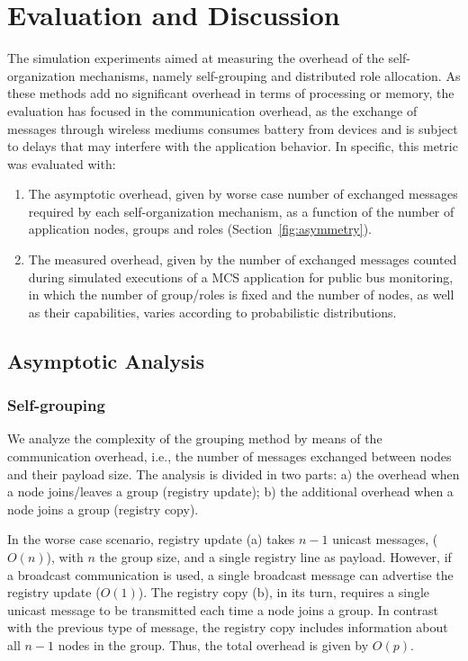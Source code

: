 

\section{Evaluation and Discussion}\label{sec:evaluation}



The simulation experiments aimed at measuring the overhead of the self-organization mechanisms, namely self-grouping and distributed role allocation. As these methods add no significant overhead in terms of processing or memory, the evaluation has focused in the communication overhead, as the exchange of messages through wireless mediums consumes battery from devices and is subject to delays that may interfere with the application behavior. In specific, this metric was evaluated with:

\begin{enumerate}[label=\Alph*]
	
	\item The asymptotic overhead, given by worse case number of exchanged messages required by each self-organization mechanism, as a function of the number of application nodes, groups and roles (Section~\ref{fig:asymmetry}). 
	
	\item The measured overhead, given by the number of exchanged messages counted during simulated executions of a MCS application for public bus monitoring, in which the number of group/roles is fixed and the number of nodes, as well as their capabilities, varies according to probabilistic distributions.
	
\end{enumerate}


\subsection{Asymptotic Analysis} 

\subsubsection{\textbf{Self-grouping}} We analyze the complexity of the grouping method by means of the communication overhead, i.e., the number of messages exchanged between nodes and their payload size. The analysis is divided in two parts: a) the overhead when a node joins/leaves a group (registry update); b) the additional overhead when a node joins a group (registry copy).

In the worse case scenario, registry update (a) takes $n-1$ unicast messages, ($O(n)$), with $n$ the group size, and a single registry line as payload. However, if a broadcast communication is used, a single broadcast message can advertise the registry update ($O(1)$).
The registry copy (b), in its turn, requires a single unicast message to be transmitted each time a node joins a group. In contrast with the previous type of message, the registry copy includes information about all $n-1$ nodes in the group. Thus, the total overhead is given by $O(p)$.

